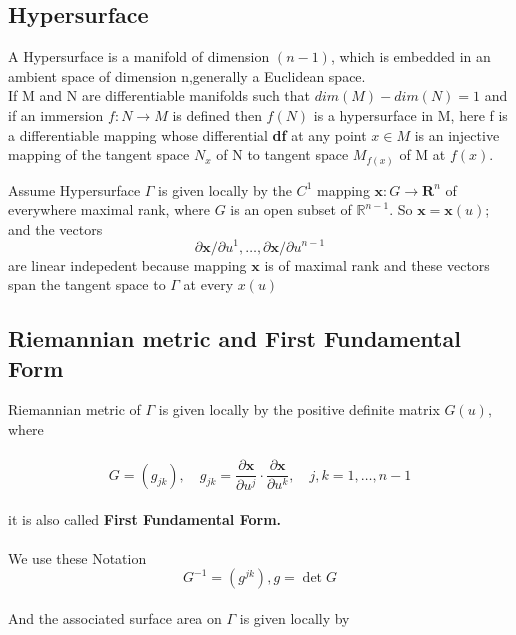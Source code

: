 \documentclass[oneside]{book}
\begin{document}
\subsection{Hypersurface}
\label{ss:5}



A Hypersurface is a manifold of dimension $(n-1)$, which is embedded in an ambient space of dimension n,generally a Euclidean space.
\\
    If M and N are differentiable manifolds such that $dim(M)-dim(N) = 1$ and if an immersion $f:N\rightarrow M$ is defined then $f(N)$ is a hypersurface in M, here f is a differentiable mapping whose differential \textbf{df} at any point  $x\in M$ is an injective mapping of the 
     tangent space $N_{x}$ of N to  tangent space $M_{f(x)}$ of M at $f(x)$.
    

    
    
       Assume  Hypersurface $\Gamma$ is given locally by the $C^{1}$ mapping $\mathbf{x}: G \rightarrow \mathbf{R}^{n}$ of everywhere
maximal rank, where $G$ is an open subset of $\mathbb{R}^{n-1} .$ So $\mathbf{x}=\mathbf{x}(u)$; and the vectors \\
$$
\partial \mathbf{x} / \partial u^{1}, \ldots, \partial \mathbf{x} / \partial u^{n-1} 
$$
are linear indepedent because  mapping $\mathbf{x}$ is of maximal rank and these vectors span the tangent space to $\Gamma$ at every $x(u)$\\







   


\subsection{Riemannian metric and First Fundamental Form}
\label{ss:6}
{Riemannian metric} of $\Gamma$ is given
locally by the positive definite matrix $G(u),$ where 
\\\\
  \begin{equation}
  \label{eq17}  
 G=\left(g_{j k}\right), \quad g_{j k}=\frac{\partial \mathbf{x}}{\partial u^{j}} \cdot \frac{\partial \mathbf{x}}{\partial u^{k}}, \quad j, k=1, \ldots, n-1     \end{equation}
\\
it is also called \textbf{First Fundamental Form.} \\\\
   We use these Notation \\
   \[ G^{-1}=\left(g^{j k}\right),   g=\operatorname{det}{G} \] \\
    And the associated surface area on  
   $\Gamma$ is given locally by \\
\end{document}
